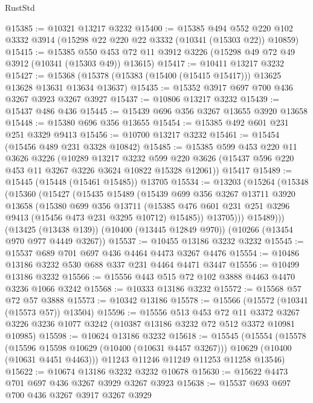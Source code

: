 \begin{lexlean}{RustStd}
\begin{coremodule}
@15385 := @10321 @13217 @3232
@15400 := @15385
    @494
    @552
    @220
    @102
    @3332
    @3914
    (@15298 @22 @220 @22 @3332 (@10341 (@15303 @22)) @10859)
@15415 := @15385
    @550
    @453
    @72
    @11
    @3912
    @3226
    (@15298 @49 @72 @49 @3912 (@10341 (@15303 @49)) @13615)
@15417 := @10411 @13217 @3232
@15427 := @15368 (@15378 (@15383 (@15400 (@15415 @15417))) @13625 @13628 @13631 @13634 @13637)
@15435 := @15352 @3917 @697 @700 @436 @3267 @3923 @3267 @3927
@15437 := @10806 @13217 @3232
@15439 := @15437 @486 @436
@15445 := @15439 @696 @356 @3267 @13655 @3920 @13658
@15448 := @15380 @696 @356 @13655
@15454 := @15385 @492 @601 @231 @251 @3329 @9413
@15456 := @10700 @13217 @3232
@15461 := @15454 (@15456 @489 @231 @3328 @10842)
@15485 := @15385
    @599
    @453
    @220
    @11
    @3626
    @3226
    (@10289
      @13217
      @3232
      @599
      @220
      @3626
      (@15437 @596 @220 @453 @11 @3267 @3226 @3624 @10822 @15328 @12061))
    @15417
@15489 := @15445 (@15448 (@15461 @15485)) @13705
@15534 := @13203
    (@15264
      (@15348
        (@15360
          (@15427
            (@15435
              @15489
              (@15439
                @699
                @356
                @3267
                @13711
                @3920
                @13658
                (@15380
                  @699
                  @356
                  @13711
                  (@15385 @476 @601 @231 @251 @3296 @9413 (@15456 @473 @231 @3295 @10712) @15485))
                @13705)))
          @15489)))
    (@13425 (@13438 @139))
    (@10400 (@13445 @12849 @970))
    (@10266 (@13454 @970 @977 @4449 @3267))
@15537 := @10455 @13186 @3232 @3232
@15545 := @15537 @689 @701 @697 @436 @4464 @4473 @3267 @4476
@15554 := @10486 @13186 @3232 @530 @688 @337 @231 @4464 @4471 @3447
@15556 := @10499 @13186 @3232
@15566 := @15556 @443 @515 @72 @102 @3888 @4463 @4470 @3236 @1066 @3242
@15568 := @10333 @13186 @3232
@15572 := @15568 @57 @72 @57 @3888
@15573 := @10342 @13186
@15578 := @15566 (@15572 (@10341 (@15573 @57)) @13504)
@15596 := @15556
    @513
    @453
    @72
    @11
    @3372
    @3267
    @3226
    @3236
    @1077
    @3242
    (@10387 @13186 @3232 @72 @512 @3372 @10981 @10985)
@15598 := @10624 @13186 @3232
@15618 := @15545
    (@15554
      (@15578
        (@15596 @15598 @10629 (@10400 (@10631 @4457 @3267)))
        @10629
        (@10400 (@10631 @4451 @4463)))
      @11243
      @11246
      @11249
      @11253
      @11258
      @13546)
@15622 := @10674 @13186 @3232 @3232 @10678
@15630 := @15622 @4473 @701 @697 @436 @3267 @3929 @3267 @3923
@15638 := @15537 @693 @697 @700 @436 @3267 @3917 @3267 @3929

\end{coremodule}
\end{lexlean}
